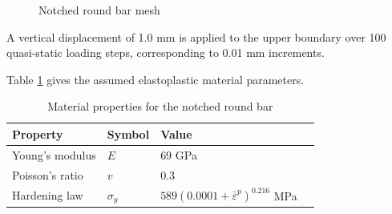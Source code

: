 \documentclass[sn-mathphys,Numbered,draft]{sn-jnl}%
\begin{document}
\begin{figure}[htbp]
	\centering
		
		
		\caption{Notched round bar mesh}
	\label{fig:notched_bar_mesh}
\end{figure}

A vertical displacement of 1.0 \si{\milli\meter} is applied to the upper boundary over 100 quasi-static loading steps, corresponding to 0.01 \si{\milli\meter} increments.

Table \ref{tab:notched_bar_mat} gives the assumed elastoplastic material parameters.
\begin{table}[htb]
	\centering
		\begin{tabular}{llll} \hline
			Property & Symbol & Value  \\ \hline 
			Young's modulus & $E$ & $69$ GPa \\
			Poisson's ratio & $v$ & $0.3$   \\
			Hardening law & $\sigma_y$ & $589({0.0001+\bar{\varepsilon}}^p)^{0.216}$ MPa  \\
			\hline
		\end{tabular}
	\caption{Material properties for the notched round bar}
	\label{tab:notched_bar_mat}
\end{table}
\end{document}

